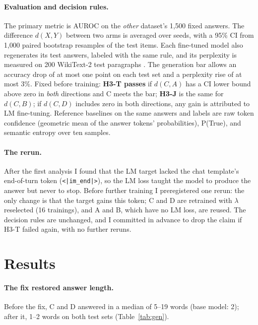 \documentclass[11pt]{article}
\begin{document}
\paragraph{Evaluation and decision rules.} The primary metric is AUROC on the \emph{other} dataset's 1,500 fixed answers. The difference $d(X,Y)$ between two arms is averaged over seeds, with a 95\% CI from 1,000 paired bootstrap resamples of the test items. Each fine-tuned model also regenerates its test answers, labeled with the same rule, and its perplexity is measured on 200 WikiText-2 test paragraphs \citep{merity2017pointer}. The generation bar allows an accuracy drop of at most one point on each test set and a perplexity rise of at most 3\%. Fixed before training: \textbf{H3-T passes} if $d(C,A)$ has a CI lower bound above zero in \emph{both} directions and C meets the bar; \textbf{H3-J} is the same for $d(C,B)$; if $d(C,D)$ includes zero in both directions, any gain is attributed to LM fine-tuning. Reference baselines on the same answers and labels are raw token confidence (geometric mean of the answer tokens' probabilities), P(True), and semantic entropy over ten samples.

\paragraph{The rerun.} After the first analysis I found that the LM target lacked the chat template's end-of-turn token (\texttt{<|im\_end|>}), so the LM loss taught the model to produce the answer but never to stop. Before further training I preregistered one rerun: the only change is that the target gains this token; C and D are retrained with $\lambda$ reselected (16 trainings), and A and B, which have no LM loss, are reused. The decision rules are unchanged, and I committed in advance to drop the claim if H3-T failed again, with no further reruns.

\section{Results}

\paragraph{The fix restored answer length.} Before the fix, C and D answered in a median of 5--19 words (base model: 2); after it, 1--2 words on both test sets (Table~\ref{tab:gen}).
\end{document}
